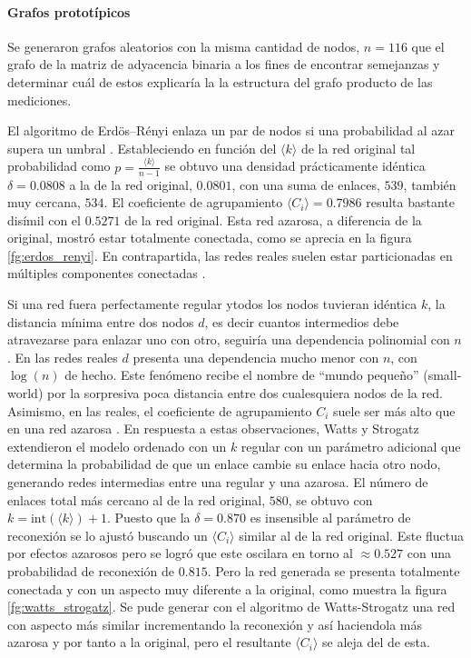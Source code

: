 \documentclass{article}
\begin{document}
\paragraph{Grafos prototípicos}
Se generaron grafos aleatorios con la misma cantidad de nodos, $n = 116$ que el grafo de la matriz de adyacencia binaria a los fines de encontrar semejanzas y determinar cuál de estos explicaría la la estructura del grafo producto de las mediciones.

El algoritmo de Erdös–Rényi enlaza un par de nodos si una probabilidad al azar supera un umbral \cite[sección 3.2]{albert-laszlo_barabasi_network_2016}.
Estableciendo en función del $\langle k \rangle$ de la red original tal probabilidad como $p = \frac{\langle k \rangle}{n -1}$ se obtuvo una densidad prácticamente idéntica $\delta = 0.0808$ a la de la red original, $0.0801$, con una suma de enlaces, $539$, también muy cercana, $534$. 
El coeficiente de agrupamiento $\langle C_i \rangle = 0.7986$ resulta bastante disímil con el $0.5271$ de la red original.
Esta red azarosa, a diferencia de la original, mostró estar totalmente conectada, como se aprecia en la figura \ref{fg:erdos_renyi}. 
En contrapartida, las redes reales suelen estar particionadas en múltiples componentes conectadas \cite[sección 3.7]{albert-laszlo_barabasi_network_2016}.

Si una red fuera perfectamente regular ytodos los nodos tuvieran idéntica $k$, la distancia mínima entre dos nodos $d$, es decir cuantos intermedios debe atravezarse para enlazar uno con otro, seguiría una dependencia polinomial con $n$.
En las redes reales $d$ presenta una dependencia mucho menor con $n$, con $\log(n)$ de hecho.
Este fenómeno recibe el nombre de ``mundo pequeño'' (small-world) por la sorpresiva poca distancia entre dos cualesquiera nodos de la red.
Asimismo, en las reales, el coeficiente de agrupamiento $C_i$ suele ser más alto que en una red azarosa \cite[sección 3.9]{albert-laszlo_barabasi_network_2016}. 
En respuesta a estas observaciones, Watts y Strogatz extendieron el modelo ordenado con un $k$ regular con un parámetro adicional que determina la probabilidad de que un enlace cambie su enlace hacia otro nodo, generando redes intermedias entre una regular y una azarosa.
El número de enlaces total más cercano al de la red original, $580$, se obtuvo con $k = \mathrm{int}(\langle k \rangle) + 1$. 
Puesto que la $\delta = 0.870$ es insensible al parámetro de reconexión se lo ajustó buscando un $\langle C_i \rangle$ similar al de la red original.
Este fluctua por efectos azarosos pero se logró que este oscilara en torno al $\approx 0.527$ con una probabilidad de reconexión de $0.815$.
Pero la red generada se presenta totalmente conectada y con un aspecto muy diferente a la original, como muestra la figura \ref{fg:watts_strogatz}. 
Se pude generar con el algoritmo de Watts-Strogatz una red con aspecto más similar incrementando la reconexión y así haciendola más azarosa y por tanto a la original, pero el resultante $\langle C_i \rangle$ se aleja del de esta.
\end{document}
